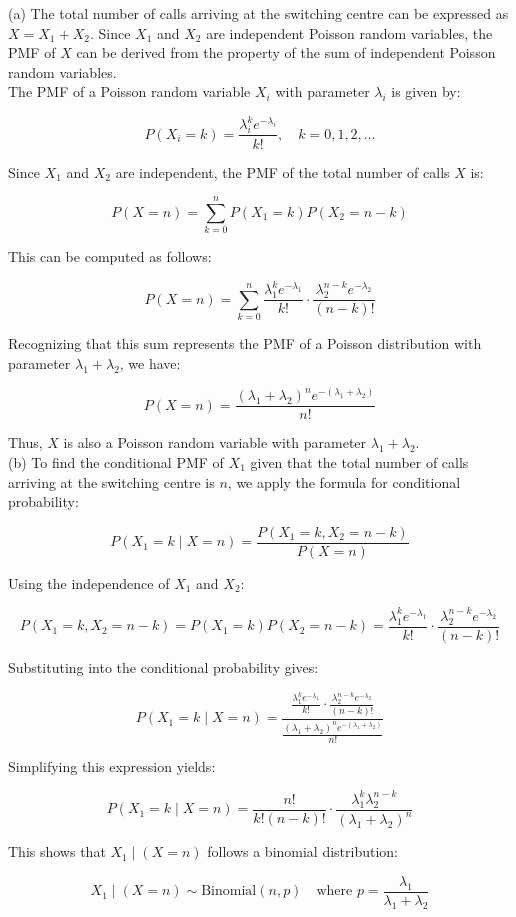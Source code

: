 \begin{solution}

(a) The total number of calls arriving at the switching centre can be expressed as \( X = X_1 + X_2 \). Since \( X_1 \) and \( X_2 \) are independent Poisson random variables, the PMF of \( X \) can be derived from the property of the sum of independent Poisson random variables.\\

The PMF of a Poisson random variable \( X_i \) with parameter \( \lambda_i \) is given by:

\[
P(X_i = k) = \frac{\lambda_i^k e^{-\lambda_i}}{k!}, \quad k = 0, 1, 2, \ldots
\]

Since \( X_1 \) and \( X_2 \) are independent, the PMF of the total number of calls \( X \) is:

\[
P(X = n) = \sum_{k=0}^{n} P(X_1 = k) P(X_2 = n-k)
\]

This can be computed as follows:

\[
P(X = n) = \sum_{k=0}^{n} \frac{\lambda_1^k e^{-\lambda_1}}{k!} \cdot \frac{\lambda_2^{n-k} e^{-\lambda_2}}{(n-k)!}
\]

Recognizing that this sum represents the PMF of a Poisson distribution with parameter \( \lambda_1 + \lambda_2 \), we have:

\[
P(X = n) = \frac{(\lambda_1 + \lambda_2)^n e^{-(\lambda_1 + \lambda_2)}}{n!}
\]

Thus, \( X \) is also a Poisson random variable with parameter \( \lambda_1 + \lambda_2 \).\\

(b) To find the conditional PMF of \( X_1 \) given that the total number of calls arriving at the switching centre is \( n \), we apply the formula for conditional probability:

\[
P(X_1 = k \mid X = n) = \frac{P(X_1 = k, X_2 = n-k)}{P(X = n)}
\]

Using the independence of \( X_1 \) and \( X_2 \):

\[
P(X_1 = k, X_2 = n-k) = P(X_1 = k) P(X_2 = n-k) = \frac{\lambda_1^k e^{-\lambda_1}}{k!} \cdot \frac{\lambda_2^{n-k} e^{-\lambda_2}}{(n-k)!}
\]

Substituting into the conditional probability gives:

\[
P(X_1 = k \mid X = n) = \frac{\frac{\lambda_1^k e^{-\lambda_1}}{k!} \cdot \frac{\lambda_2^{n-k} e^{-\lambda_2}}{(n-k)!}}{\frac{(\lambda_1 + \lambda_2)^n e^{-(\lambda_1 + \lambda_2)}}{n!}}
\]

Simplifying this expression yields:

\[
P(X_1 = k \mid X = n) = \frac{n!}{k!(n-k)!} \cdot \frac{\lambda_1^k \lambda_2^{n-k}}{(\lambda_1 + \lambda_2)^n}
\]

This shows that \( X_1 \mid (X = n) \) follows a binomial distribution:

\[
X_1 \mid (X = n) \sim \text{Binomial}(n, p) \quad \text{where } p = \frac{\lambda_1}{\lambda_1 + \lambda_2}
\]
\end{solution}

